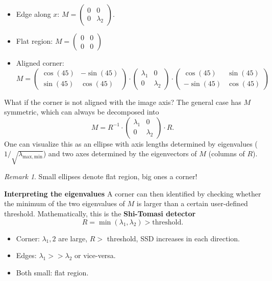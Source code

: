 \documentclass[a4paper,12 pt]{article}
\theoremstyle{definition}
\theoremstyle{remark}
\newtheorem*{bmk}{Remark}
\theoremstyle{definition}
\theoremstyle{definition}
\theoremstyle{definition}
\theoremstyle{remark}
\theoremstyle{definition}
\begin{document}
\begin{itemize}
\item Edge along $x$: $M=\begin{pmatrix} 0&0\\ 0&\lambda_2
\end{pmatrix}$.
\item Flat region: $M=\begin{pmatrix} 0&0\\ 0&0 \end{pmatrix}$
\item Aligned corner: $M=\begin{pmatrix} \cos(45)&-\sin(45)\\ \sin(45) & \cos(45) \end{pmatrix}\cdot \begin{pmatrix} \lambda_1 &0 \\
0& \lambda_2 \end{pmatrix}\cdot \begin{pmatrix} \cos(45)&\sin(45)\\ -\sin(45) & \cos(45) \end{pmatrix}$
\end{itemize}
What if the corner is not aligned with the image axis? The general case has $M$ symmetric, which can always be decomposed into
\begin{equation}
M=R^{-1}\cdot \begin{pmatrix}
 \lambda_1 &0 \\ 0 & \lambda_2
 \end{pmatrix} \cdot R.
\end{equation}
One can visualize this as an ellipse with axis lengths determined by eigenvalues ($1/\sqrt{\lambda_\mathrm{max,min}}$) and two axes determined by the eigenvectors of $M$ (columns of $R$). 
\begin{bmk}
Small ellipses denote flat region, big ones a corner!
\end{bmk}
\textbf{Interpreting the eigenvalues}
A corner can then identified by checking whether the minimum of the two eigenvalues of $M$ is larger than a certain user-defined threshold. Mathematically, this is the \textbf{Shi-Tomasi detector} 
\begin{equation}
R=\min (\lambda_1,\lambda_2) > \text{threshold}.
\end{equation}
\begin{itemize}
\item Corner: $\lambda_1,2$ are large, $R>$ threshold, SSD increases in each direction.
\item Edges: $\lambda_1 >> \lambda_2$ or vice-versa.
\item Both small: flat region.
\end{itemize}
\end{document}
